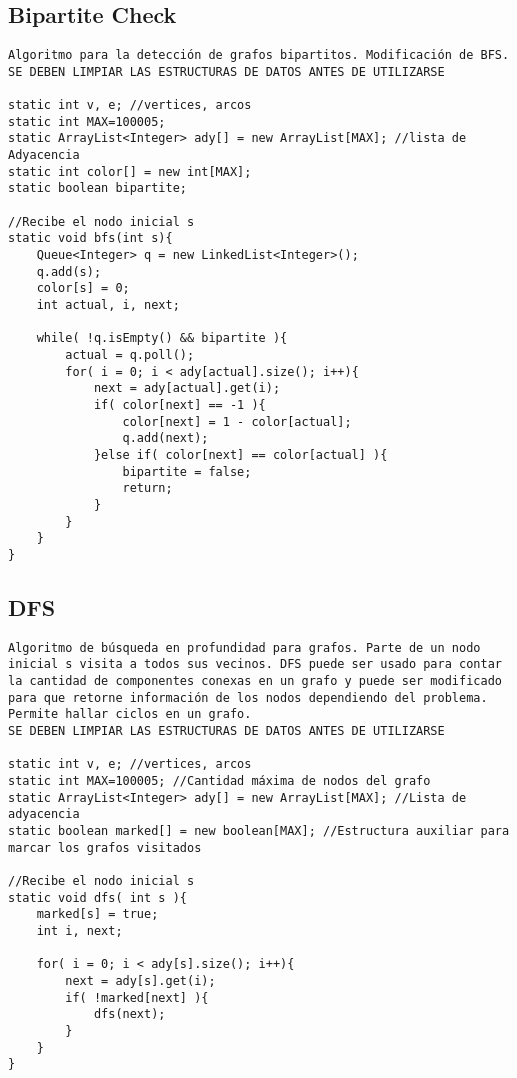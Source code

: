 \documentclass[10pt,letterpaper,twocolumn,twosided]{article}
\begin{document}
\subsection{Bipartite Check}
\begin{lstlisting}
Algoritmo para la detección de grafos bipartitos. Modificación de BFS.
SE DEBEN LIMPIAR LAS ESTRUCTURAS DE DATOS ANTES DE UTILIZARSE

static int v, e; //vertices, arcos
static int MAX=100005; 
static ArrayList<Integer> ady[] = new ArrayList[MAX]; //lista de Adyacencia
static int color[] = new int[MAX];
static boolean bipartite;

//Recibe el nodo inicial s
static void bfs(int s){
    Queue<Integer> q = new LinkedList<Integer>();
    q.add(s); 
    color[s] = 0;
    int actual, i, next;

    while( !q.isEmpty() && bipartite ){
        actual = q.poll();
        for( i = 0; i < ady[actual].size(); i++){
            next = ady[actual].get(i);
            if( color[next] == -1 ){
                color[next] = 1 - color[actual];
                q.add(next);
            }else if( color[next] == color[actual] ){
                bipartite = false;
                return;
            }
        }
    }
}\end{lstlisting}

\subsection{DFS}
\begin{lstlisting}
Algoritmo de búsqueda en profundidad para grafos. Parte de un nodo inicial s visita a todos sus vecinos. DFS puede ser usado para contar la cantidad de componentes conexas en un grafo y puede ser modificado para que retorne información de los nodos dependiendo del problema. Permite hallar ciclos en un grafo.
SE DEBEN LIMPIAR LAS ESTRUCTURAS DE DATOS ANTES DE UTILIZARSE

static int v, e; //vertices, arcos
static int MAX=100005; //Cantidad máxima de nodos del grafo
static ArrayList<Integer> ady[] = new ArrayList[MAX]; //Lista de adyacencia
static boolean marked[] = new boolean[MAX]; //Estructura auxiliar para marcar los grafos visitados

//Recibe el nodo inicial s
static void dfs( int s ){
	marked[s] = true;
	int i, next;

	for( i = 0; i < ady[s].size(); i++){
		next = ady[s].get(i);
		if( !marked[next] ){
			dfs(next);
		}
	}
}
\end{lstlisting}
\end{document}
